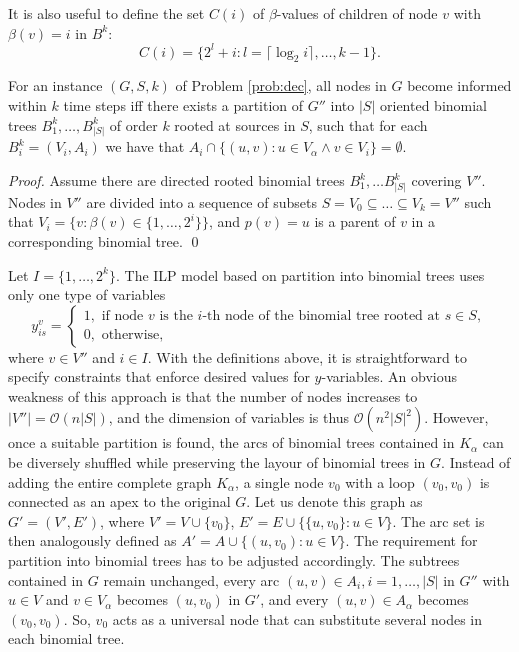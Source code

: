 It is also useful to define the set $C(i)$ of $\beta$-values of children of node $v$ with $\beta(v)=i$ in $B^k$:
\begin{equation}
C(i)=\{2^l+i:l=\lceil\log_2 i\rceil,\dots,k-1\}.
\end{equation}


\begin{proposition}
\label{lem:probeq}
For an instance $(G,S,k)$ of Problem \ref{prob:dec}, all nodes in $G$ become informed within $k$ time steps iff 
there exists a partition of $G''$ into $|S|$ oriented binomial trees $B^k_1,\dots,B^k_{|S|}$ of order $k$ rooted at sources in $S$,
such that for each $B^k_i=(V_i,A_i)$ we have that $A_i\cap\{(u,v):u \in V_\alpha \wedge v\in V_i\}=\emptyset$. 
\end{proposition}
\begin{proof}
Assume there are directed rooted binomial trees $B^k_1,\dots B^k_{|S|}$ covering $V''$. 
Nodes in $V''$ are divided into a sequence of subsets $S=V_0\subseteq\dots\subseteq V_k=V''$ such that $V_i=\{v:\beta(v)\in \{1,\dots,2^i\}\}$,
and $p(v)=u$ is a parent of $v$ in a corresponding binomial tree.
\qed
\end{proof}

Let $I=\{1,\dots,2^k\}$.
The ILP model based on partition into binomial trees uses only one type of variables
$$
y_{is}^v=\begin{cases}
1, \text{ if  node } v \text{ is the } i\text{-th node of the binomial tree rooted at } s\in S,\\
0, \text{ otherwise},
\end{cases}
$$
where $v\in V''$ and $i\in I $. 
With the definitions above, it is straightforward to specify constraints that enforce desired values for $y$-variables.
An obvious weakness of this approach is  that the number of nodes increases to $|V''|=\mathcal{O}(n|S|)$, and the dimension of variables is thus $\mathcal{O}(n^2|S|^2)$.
However, once a suitable partition is found, the arcs of binomial trees contained in $K_\alpha$ can be diversely shuffled while preserving the layour of binomial trees in $G$.
Instead of adding the entire complete graph $K_\alpha$, a single node $v_0$ with a loop $(v_0,v_0)$ is connected as an apex to the original $G$.
Let us denote this graph as $G'=(V',E')$, where $V'=V\cup\{v_0\}$, $E'=E\cup\{\{u,v_0\}:u\in V\}$. The arc set is then analogously defined as $A'=A\cup\{(u,v_0): u\in V\}$.
The requirement for partition into binomial trees has to be adjusted accordingly.
The subtrees contained in $G$ remain unchanged, every arc $(u,v)\in A_i, i=1,\dots,|S|$ in $G''$ with $u\in V$ and $v\in V_\alpha$ becomes $(u,v_0)$ in $G'$,
and every $(u,v)\in A_\alpha$ becomes $(v_0,v_0)$.
So, $v_0$ acts as a universal node that can substitute several nodes in each binomial tree.


